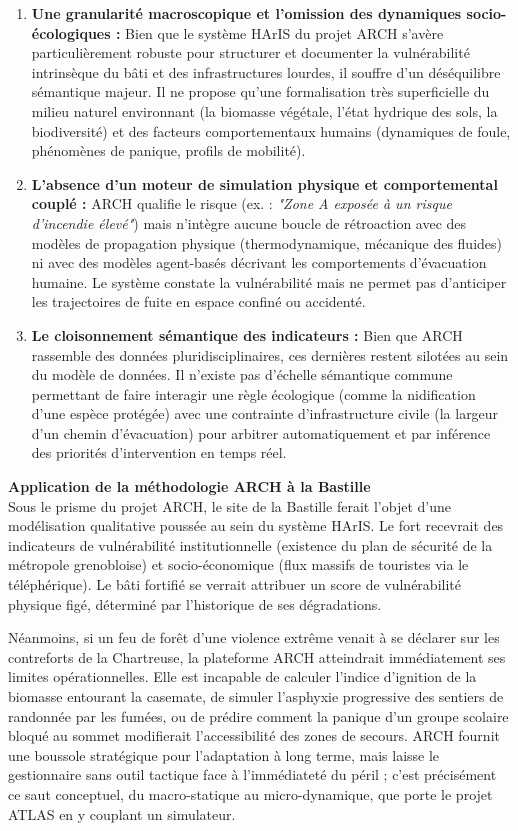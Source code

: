 \documentclass{article}
\begin{document}
\begin{enumerate}
    \item \textbf{Une granularité macroscopique et l'omission des dynamiques socio-écologiques :} Bien que le système HArIS du projet ARCH s'avère particulièrement robuste pour structurer et documenter la vulnérabilité intrinsèque du bâti et des infrastructures lourdes, il souffre d'un déséquilibre sémantique majeur. Il ne propose qu'une formalisation très superficielle du milieu naturel environnant (la biomasse végétale, l'état hydrique des sols, la biodiversité) et des facteurs comportementaux humains (dynamiques de foule, phénomènes de panique, profils de mobilité).
    \item \textbf{L'absence d'un moteur de simulation physique et comportemental couplé :} ARCH qualifie le risque (ex. : \textit{"Zone A exposée à un risque d'incendie élevé"}) mais n'intègre aucune boucle de rétroaction avec des modèles de propagation physique (thermodynamique, mécanique des fluides) ni avec des modèles agent-basés décrivant les comportements d'évacuation humaine. Le système constate la vulnérabilité mais ne permet pas d'anticiper les trajectoires de fuite en espace confiné ou accidenté.
    \item \textbf{Le cloisonnement sémantique des indicateurs : } Bien que ARCH rassemble des données pluridisciplinaires, ces dernières restent silotées au sein du modèle de données. Il n'existe pas d'échelle sémantique commune permettant de faire interagir une règle écologique (comme la nidification d'une espèce protégée) avec une contrainte d'infrastructure civile (la largeur d'un chemin d'évacuation) pour arbitrer automatiquement et par inférence des priorités d'intervention en temps réel.
\end{enumerate}
\begin{filrouge}
\textbf{Application de la méthodologie ARCH à la Bastille} \\
Sous le prisme du projet ARCH, le site de la Bastille ferait l'objet d'une modélisation qualitative poussée au sein du système HArIS. Le fort recevrait des indicateurs de vulnérabilité institutionnelle (existence du plan de sécurité de la métropole grenobloise) et socio-économique (flux massifs de touristes via le téléphérique). Le bâti fortifié se verrait attribuer un score de vulnérabilité physique figé, déterminé par l'historique de ses dégradations.

Néanmoins, si un feu de forêt d'une violence extrême venait à se déclarer sur les contreforts de la Chartreuse, la plateforme ARCH atteindrait immédiatement ses limites opérationnelles. Elle est incapable de calculer l'indice d'ignition de la biomasse entourant la casemate, de simuler l'asphyxie progressive des sentiers de randonnée par les fumées, ou de prédire comment la panique d'un groupe scolaire bloqué au sommet modifierait l'accessibilité des zones de secours. ARCH fournit une boussole stratégique pour l'adaptation à long terme, mais laisse le gestionnaire sans outil tactique face à l'immédiateté du péril ; c'est précisément ce saut conceptuel, du macro-statique au micro-dynamique, que porte le projet ATLAS en y couplant un simulateur.
\end{filrouge}
\end{document}
